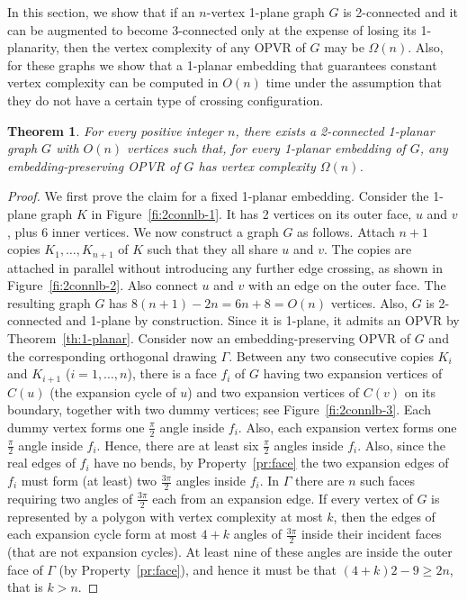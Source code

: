 \documentclass{article}
\newtheorem{theorem}{Theorem}
\newcommand{\ph}{\frac{\pi}{2}}
\newcommand{\pt}{\frac{3\pi}{2}}
\newcommand{\opvr}{OPVR\xspace}
\begin{document}
In this section, we show that if an $n$-vertex 1-plane graph $G$ is 2-connected and it can be augmented to become 3-connected only at the expense of losing its 1-planarity, then the vertex complexity of any \opvr of $G$ may be $\Omega(n)$. Also, for these graphs we show that a 1-planar embedding that guarantees constant vertex complexity can be computed in $O(n)$ time under the assumption that they do not have a certain type of crossing configuration.

\begin{theorem}\label{th:2conn-lb}
For every positive integer $n$, there exists a 2-connected 1-planar graph $G$ with $O(n)$ vertices such that, for every 1-planar embedding of $G$, any embedding-preserving \opvr of $G$ has vertex complexity $\Omega(n)$.
\end{theorem}
\begin{proof}
We first prove the claim for a fixed 1-planar embedding. Consider the 1-plane graph $K$ in Figure~\ref{fi:2connlb-1}. It has 2 vertices on its outer face, $u$ and $v$, plus 6 inner vertices. We now construct a graph $G$ as follows. Attach $n+1$ copies $K_1, \dots, K_{n+1}$ of $K$ such that they all share $u$ and $v$. The copies are attached in parallel without introducing any further edge crossing, as shown in Figure~\ref{fi:2connlb-2}. Also connect $u$ and $v$ with an edge on the outer face.  The resulting graph $G$ has $8(n+1)-2n=6n+8=O(n)$ vertices. Also, $G$ is 2-connected and 1-plane by construction. Since it is 1-plane, it admits an \opvr by Theorem~\ref{th:1-planar}. Consider now an embedding-preserving \opvr of $G$ and the corresponding orthogonal drawing $\Gamma$. Between any two consecutive copies $K_i$ and $K_{i+1}$ ($i=1,\dots,n$), there is a face $f_i$ of $G$ having two expansion vertices of $C(u)$ (the expansion cycle of $u$) and two expansion vertices of $C(v)$ on its boundary, together with two dummy vertices; see  Figure~\ref{fi:2connlb-3}. Each dummy vertex forms one $\ph$ angle inside $f_i$. Also, each expansion vertex forms one $\ph$ angle inside $f_i$. Hence, there are at least six $\ph$ angles inside $f_i$. Also, since the real edges of $f_i$ have no bends, by Property~\ref{pr:face} the two expansion edges of $f_i$ must form (at least) two $\pt$ angles inside $f_i$. In $\Gamma$ there are $n$ such faces requiring two angles of $\pt$ each from an expansion edge. If every vertex of $G$ is represented by a polygon with vertex complexity at most $k$, then the edges of each expansion cycle form at most $4+k$ angles of $\pt$ inside their incident faces (that are not expansion cycles). At least nine of these angles are inside the outer face of $\Gamma$ (by Property~\ref{pr:face}), and hence it must be that $(4+k)2-9 \geq 2n$, that is $k > n$. 


\end{proof}
\end{document}

